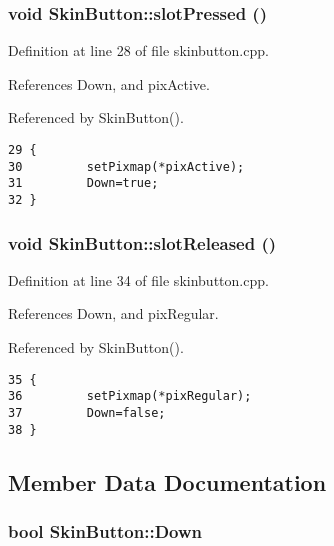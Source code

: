 \subsubsection{\setlength{\rightskip}{0pt plus 5cm}void Skin\-Button::slot\-Pressed ()\hspace{0.3cm}{\tt  [protected, slot]}}\label{classSkinButton_SkinButtonj0}




Definition at line 28 of file skinbutton.cpp.

References Down, and pix\-Active.

Referenced by Skin\-Button().



\footnotesize\begin{verbatim}29 {
30         setPixmap(*pixActive);
31         Down=true;
32 }
\end{verbatim}\normalsize 
{}
\subsubsection{\setlength{\rightskip}{0pt plus 5cm}void Skin\-Button::slot\-Released ()\hspace{0.3cm}{\tt  [protected, slot]}}\label{classSkinButton_SkinButtonj1}




Definition at line 34 of file skinbutton.cpp.

References Down, and pix\-Regular.

Referenced by Skin\-Button().



\footnotesize\begin{verbatim}35 {
36         setPixmap(*pixRegular);
37         Down=false;
38 }
\end{verbatim}\normalsize 


\subsection{Member Data Documentation}
\subsubsection{\setlength{\rightskip}{0pt plus 5cm}bool {\bf Skin\-Button::Down}}\label{classSkinButton_SkinButtono0}




